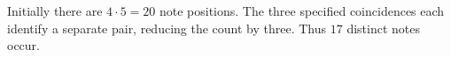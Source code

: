 Initially there are $4\cdot5=20$ note positions. The three specified coincidences each identify a separate pair, reducing the count by three. Thus $\boxed{17}$ distinct notes occur.
